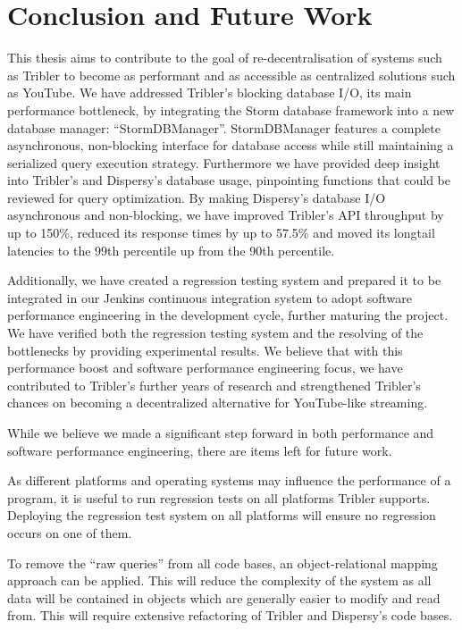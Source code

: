 \chapter{Conclusion and Future Work}
\label{cpt:conclusion_and_future_work}

This thesis aims to contribute to the goal of re-decentralisation of systems such as Tribler to become as performant and as accessible as centralized solutions such as YouTube.
We have addressed Tribler's blocking database I/O, its main performance bottleneck, by integrating the Storm database framework into a new database manager: \enquote{StormDBManager}.
StormDBManager features a complete asynchronous, non-blocking interface for database access while still maintaining a serialized query execution strategy.
Furthermore we have provided deep insight into Tribler's and Dispersy's database usage, pinpointing functions that could be reviewed for query optimization.
By making Dispersy's database I/O asynchronous and non-blocking, we have improved Tribler's API throughput by up to 150\%, reduced its response times by up to 57.5\% and moved its longtail latencies to the 99th percentile up from the 90th percentile.

Additionally, we have created a regression testing system and prepared it to be integrated in our Jenkins continuous integration system to adopt software performance engineering in the development cycle, further maturing the project.
We have verified both the regression testing system and the resolving of the bottlenecks by providing experimental results.
We believe that with this performance boost and software performance engineering focus, we have contributed to Tribler's further years of research and strengthened Tribler's chances on becoming a decentralized alternative for YouTube-like streaming.

While we believe we made a significant step forward in both performance and software performance engineering, there are items left for future work.

As different platforms and operating systems may influence the performance of a program, it is useful to run regression tests on all platforms Tribler supports.
Deploying the regression test system on all platforms will ensure no regression occurs on one of them.

To remove the \enquote{raw queries} from all code bases, an object-relational mapping approach can be applied.
This will reduce the complexity of the system as all data will be contained in objects which are generally easier to modify and read from.
This will require extensive refactoring of Tribler and Dispersy's code bases.

